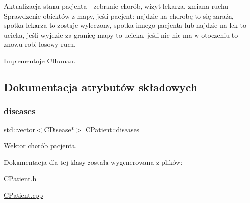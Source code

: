 Aktualizacja stanu pacjenta -\/ zebranie chorób, wizyt lekarza, zmiana ruchu Sprawdzenie obiektów z mapy, jeśli pacjent\+: najdzie na chorobę to się zaraża, spotka lekarza to zostaje wyleczony, spotka innego pacjenta lub najdzie na lek to ucieka, jeśli wyjdzie za granicę mapy to ucieka, jeśli nic nie ma w otoczeniu to znowu robi losowy ruch. 



Implementuje \mbox{\hyperlink{class_c_human_adb7f7d855ace82f7517bb49f465ea5d9}{C\+Human}}.



\subsection{Dokumentacja atrybutów składowych}
\mbox{\label{class_c_patient_afab106fb42bcb95d251193cc58d5d4af}} 
\subsubsection{\texorpdfstring{diseases}{diseases}}
{\footnotesize\ttfamily std\+::vector$<$\mbox{\hyperlink{class_c_disease}{C\+Disease}}$\ast$$>$ C\+Patient\+::diseases\hspace{0.3cm}{\ttfamily [protected]}}



Wektor chorób pacjenta. 



Dokumentacja dla tej klasy została wygenerowana z plików\+:\begin{DoxyCompactItemize}
\item 
\mbox{\hyperlink{_c_patient_8h}{C\+Patient.\+h}}\item 
\mbox{\hyperlink{_c_patient_8cpp}{C\+Patient.\+cpp}}\end{DoxyCompactItemize}
